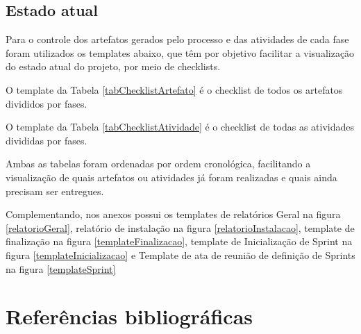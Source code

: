 \documentclass[	DIV=calc,%
							paper=a4,%
							fontsize=12pt,%
							onecolumn]{scrartcl}%
\begin{document}

\FloatBarrier

\subsection{Estado atual}
Para o controle dos artefatos gerados pelo processo e das atividades de cada fase foram utilizados os templates abaixo, que têm por objetivo facilitar a visualização do estado atual do projeto, por meio de checklists.

O template da Tabela \ref{tabChecklistArtefato} é o checklist de todos os artefatos divididos por fases.

O template da Tabela \ref{tabChecklistAtividade} é o checklist de todas as atividades divididas por fases.

Ambas as tabelas foram ordenadas por ordem cronológica, facilitando a visualização de quais artefatos ou atividades já foram realizadas e quais ainda precisam ser entregues.


\FloatBarrier


\FloatBarrier

Complementando, nos anexos possui os templates de relatórios Geral na figura \ref{relatorioGeral}, relatório de instalação na figura \ref{relatorioInstalacao},
template de finalização na figura \ref{templateFinalizacao}, template de Inicialização de Sprint na figura \ref{templateInicializacao} e Template de ata de reunião de definição de Sprints na figura \ref{templateSprint}


\section{Referências bibliográficas}
\renewcommand\refname{} %

  
\end{document}
